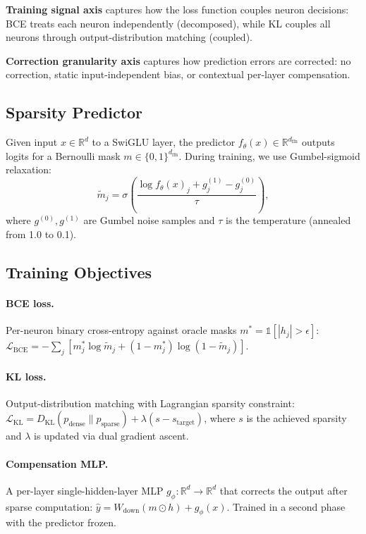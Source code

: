 \documentclass[11pt]{article}
\begin{document}
\noindent\textbf{Training signal axis} captures how the loss function couples neuron decisions: BCE treats each neuron independently (decomposed), while KL couples all neurons through output-distribution matching (coupled).

\noindent\textbf{Correction granularity axis} captures how prediction errors are corrected: no correction, static input-independent bias, or contextual per-layer compensation.

\subsection{Sparsity Predictor}

Given input $x \in \mathbb{R}^d$ to a SwiGLU layer, the predictor $f_\theta(x) \in \mathbb{R}^{d_{\text{ffn}}}$ outputs logits for a Bernoulli mask $m \in \{0, 1\}^{d_{\text{ffn}}}$.
During training, we use Gumbel-sigmoid relaxation:
\begin{equation}
\tilde{m}_j = \sigma\left(\frac{\log f_\theta(x)_j + g_j^{(1)} - g_j^{(0)}}{\tau}\right),
\end{equation}
where $g^{(0)}, g^{(1)}$ are Gumbel noise samples and $\tau$ is the temperature (annealed from 1.0 to 0.1).

\subsection{Training Objectives}

\paragraph{BCE loss.} Per-neuron binary cross-entropy against oracle masks $m^* = \mathbb{1}[|h_j| > \epsilon]$:
$\mathcal{L}_{\text{BCE}} = -\sum_j [m^*_j \log \tilde{m}_j + (1-m^*_j)\log(1-\tilde{m}_j)]$.

\paragraph{KL loss.} Output-distribution matching with Lagrangian sparsity constraint:
$\mathcal{L}_{\text{KL}} = D_{\text{KL}}(p_{\text{dense}} \| p_{\text{sparse}}) + \lambda (s - s_{\text{target}})$,
where $s$ is the achieved sparsity and $\lambda$ is updated via dual gradient ascent.

\paragraph{Compensation MLP.} A per-layer single-hidden-layer MLP $g_\phi: \mathbb{R}^d \to \mathbb{R}^d$ that corrects the output after sparse computation:
$\hat{y} = W_{\text{down}} (m \odot h) + g_\phi(x)$.
Trained in a second phase with the predictor frozen.
\end{document}
